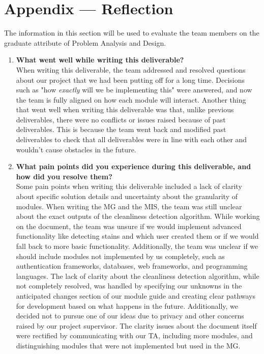 \documentclass[12pt, titlepage]{article}
\begin{document}
\newpage{}

\section*{Appendix --- Reflection}

The information in this section will be used to evaluate the team members on the
graduate attribute of Problem Analysis and Design.



\begin{enumerate}
  \item \textbf{What went well while writing this deliverable?}\\
  When writing this deliverable, the team addressed and resolved questions about our project that we had been putting off for a long time. Decisions such as "how \textit{exactly} will we be implementing this" were answered, and now the team is fully aligned on how each module will interact. Another thing that went well when writing this deliverable was that, unlike previous deliverables, there were no conflicts or issues raised because of past deliverables. This is because the team went back and modified past deliverables to check that all deliverables were in line with each other and wouldn't cause obstacles in the future.
  \item \textbf{What pain points did you experience during this deliverable, and how
    did you resolve them?}\\
    Some pain points when writing this deliverable included a lack of clarity about specific solution details and uncertainty about the granularity of modules. When writing the MG and the MIS, the team was still unclear about the exact outputs of the cleanliness detection algorithm. While working on the document, the team was unsure if we would implement advanced functionality like detecting stains and which user created them or if we would fall back to more basic functionality. Additionally, the team was unclear if we should include modules not implemented by us completely, such as authentication frameworks, databases, web frameworks, and programming languages. The lack of clarity about the cleanliness detection algorithm, while not completely resolved, was handled by specifying our unknowns in the anticipated changes section of our module guide and creating clear pathways for development based on what happens in the future. Additionally, we decided not to pursue one of our ideas due to privacy and other concerns raised by our project supervisor. The clarity issues about the document itself were rectified by communicating with our TA, including more modules, and distinguishing modules that were not implemented but used in the MG.      

\end{enumerate}
\end{document}
